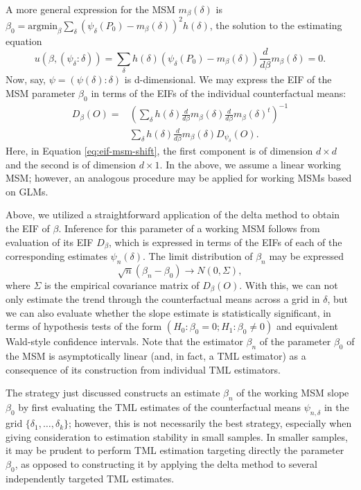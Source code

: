 \documentclass[
  12pt, krantz2,
]{krantz}
\newcommand{\1}{\mathbbm{1}}
\theoremstyle{definition}
\theoremstyle{definition}
\theoremstyle{definition}
\theoremstyle{definition}
\theoremstyle{remark}
\begin{document}
A more general expression for the MSM \(m_{\beta}(\delta)\) is \(\beta_0 = \text{argmin}_{\beta} \sum_{\delta}(\psi_{\delta}(P_0) - m_{\beta}(\delta))^2 h(\delta)\), the solution to the estimating equation
\[u(\beta, (\psi_{\delta}: \delta)) = \sum_{\delta}h(\delta)
\left(\psi_{\delta}(P_0) - m_{\beta}(\delta) \right) \frac{d}{d\beta}
m_{\beta}(\delta) = 0.\]
Now, say, \(\psi = (\psi(\delta): \delta)\) is d-dimensional. We may express the
EIF of the MSM parameter \(\beta_0\) in terms of the EIFs of the individual
counterfactual means:
\begin{align}
   D_{\beta}(O) = &\left(\sum_{\delta} h(\delta) \frac{d}{d\beta}
   m_{\beta}(\delta) \frac{d}{d\beta} m_{\beta}(\delta)^t \right)^{-1}
   \\ \nonumber
   &\sum_{\delta} h(\delta) \frac{d}{d\beta} m_{\beta}(\delta)
   D_{\psi_{\delta}}(O).
   \label{eq:eif-msm-shift}
\end{align}
Here, in Equation \eqref{eq:eif-msm-shift}, the first component is of dimension
\(d \times d\) and the second is of dimension \(d \times 1\). In the above, we
assume a linear working MSM; however, an analogous procedure may be applied for
working MSMs based on GLMs.

Above, we utilized a straightforward application of the delta method to obtain
the EIF of \(\beta\). Inference for this parameter of a working MSM follows from
evaluation of its EIF \(D_{\beta}\), which is expressed in terms of the EIFs of
each of the corresponding estimates \(\psi_n(\delta)\). The limit distribution of
\(\beta_n\) may be expressed \[\sqrt{n}(\beta_n - \beta_0) \to N(0, \Sigma),\]
where \(\Sigma\) is the empirical covariance matrix of \(D_{\beta}(O)\). With this,
we can not only estimate the trend through the counterfactual means across a
grid in \(\delta\), but we can also evaluate whether the slope estimate is
statistically significant, in terms of hypothesis tests of the form \((H_0: \beta_0 = 0; H_1: \beta_0 \neq 0)\) and equivalent Wald-style confidence
intervals. Note that the estimator \(\beta_n\) of the parameter \(\beta_0\) of the
MSM is asymptotically linear (and, in fact, a TML estimator) as a consequence of
its construction from individual TML estimators.

The strategy just discussed constructs an estimate \(\beta_n\) of the working MSM
slope \(\beta_0\) by first evaluating the TML estimates of the counterfactual
means \(\psi_{n,\delta}\) in the grid \(\{\delta_1, \ldots, \delta_k\}\); however,
this is not necessarily the best strategy, especially when giving consideration
to estimation stability in small samples. In smaller samples, it may be prudent
to perform TML estimation targeting directly the parameter \(\beta_0\), as opposed
to constructing it by applying the delta method to several independently
targeted TML estimates.
\end{document}
